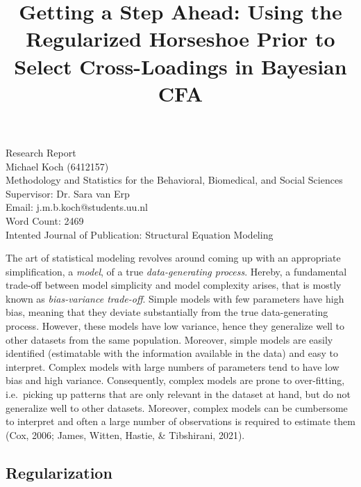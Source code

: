 \documentclass[
  man,floatsintext]{apa6}
\title{Getting a Step Ahead: Using the Regularized Horseshoe Prior to Select Cross-Loadings in Bayesian CFA}
\author{\phantom{0}}
\date{}
\affiliation{\phantom{0}}
\begin{document}
\maketitle

\vfill
Research Report\\
Michael Koch (6412157)\\
Methodology and Statistics for the Behavioral, Biomedical, and Social Sciences \\
Supervisor: Dr. Sara van Erp \\ 
Email: j.m.b.koch@students.uu.nl \\
Word Count: 2469 \\
Intented Journal of Publication: Structural Equation Modeling \\

\setcounter{page}{0}
\thispagestyle{empty}
\pagestyle{plain}

\clearpage

The art of statistical modeling revolves around coming up with an appropriate simplification, a \emph{model}, of a true \emph{data-generating process}. Hereby, a fundamental trade-off between model simplicity and model complexity arises, that is mostly known as \emph{bias-variance trade-off}. Simple models with few parameters have high bias, meaning that they deviate substantially from the true data-generating process. However, these models have low variance, hence they generalize well to other datasets from the same population. Moreover, simple models are easily identified (estimatable with the information available in the data) and easy to interpret. Complex models with large numbers of parameters tend to have low bias and high variance. Consequently, complex models are prone to over-fitting, i.e.~picking up patterns that are only relevant in the dataset at hand, but do not generalize well to other datasets. Moreover, complex models can be cumbersome to interpret and often a large number of observations is required to estimate them (Cox, 2006; James, Witten, Hastie, \& Tibshirani, 2021).

\hypertarget{regularization}{%
\subsection{Regularization}\label{regularization}}
\end{document}
